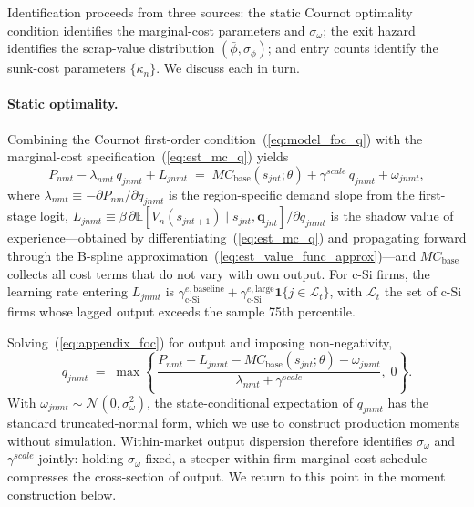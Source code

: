 \documentclass[12pt]{article}
\begin{document}
Identification proceeds from three sources: the static Cournot optimality condition identifies the marginal-cost parameters and $\sigma_\omega$; the exit hazard identifies the scrap-value distribution $(\bar\phi,\sigma_\phi)$; and entry counts identify the sunk-cost parameters $\{\kappa_n\}$. We discuss each in turn.
 
\paragraph{Static optimality.} Combining the Cournot first-order condition~(\ref{eq:model_foc_q}) with the marginal-cost specification~(\ref{eq:est_mc_q}) yields
\begin{equation}
P_{nmt} - \lambda_{nmt}\,q_{jnmt} + L_{jnmt} \;=\; MC_{\text{base}}(s_{jnt};\theta) + \gamma^{scale}\,q_{jnmt} + \omega_{jnmt},
\label{eq:appendix_foc}
\end{equation}
where $\lambda_{nmt} \equiv -\partial P_{nm}/\partial q_{jnmt}$ is the region-specific demand slope from the first-stage logit, $L_{jnmt} \equiv \beta\,\partial \mathbb{E}[V_n(s_{jnt+1})\mid s_{jnt},\boldsymbol{q}_{jnt}]/\partial q_{jnmt}$ is the shadow value of experience---obtained by differentiating~(\ref{eq:est_mc_q}) and propagating forward through the B-spline approximation~(\ref{eq:est_value_func_approx})---and $MC_{\text{base}}$ collects all cost terms that do not vary with own output. For c-Si firms, the learning rate entering $L_{jnmt}$ is $\gamma^{e,\text{baseline}}_{\text{c-Si}} + \gamma^{e,\text{large}}_{\text{c-Si}}\mathbf{1}\{j\in\mathcal{L}_t\}$, with $\mathcal{L}_t$ the set of c-Si firms whose lagged output exceeds the sample 75th percentile.
 
Solving~(\ref{eq:appendix_foc}) for output and imposing non-negativity,
\begin{equation}
q_{jnmt} \;=\; \max\!\left\{\,\frac{P_{nmt} + L_{jnmt} - MC_{\text{base}}(s_{jnt};\theta) - \omega_{jnmt}}{\lambda_{nmt} + \gamma^{scale}},\;0\right\}.
\label{eq:appendix_q_closedform}
\end{equation}
With $\omega_{jnmt}\sim\mathcal{N}(0,\sigma_\omega^2)$, the state-conditional expectation of $q_{jnmt}$ has the standard truncated-normal form, which we use to construct production moments without simulation. Within-market output dispersion therefore identifies $\sigma_\omega$ and $\gamma^{scale}$ jointly: holding $\sigma_\omega$ fixed, a steeper within-firm marginal-cost schedule compresses the cross-section of output. We return to this point in the moment construction below.
 
\end{document}
